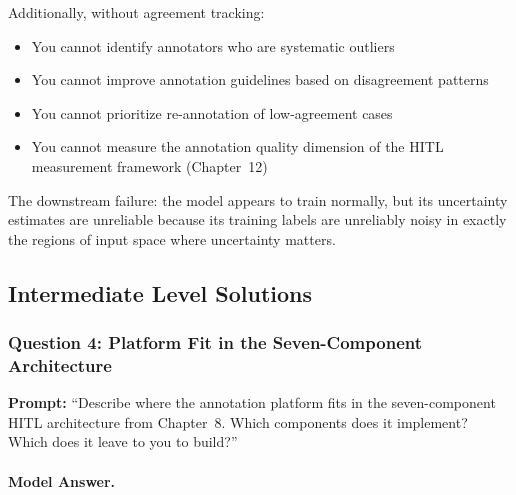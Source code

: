 Additionally, without agreement tracking:
\begin{itemize}
    \item You cannot identify annotators who are systematic outliers
    \item You cannot improve annotation guidelines based on disagreement patterns
    \item You cannot prioritize re-annotation of low-agreement cases
    \item You cannot measure the annotation quality dimension of the HITL measurement framework (Chapter~12)
\end{itemize}

The downstream failure: the model appears to train normally, but its uncertainty estimates are unreliable because its training labels are unreliably noisy in exactly the regions of input space where uncertainty matters.

\subsection{Intermediate Level Solutions}

\subsubsection{Question 4: Platform Fit in the Seven-Component Architecture}

\textbf{Prompt:} ``Describe where the annotation platform fits in the seven-component HITL architecture from Chapter~8. Which components does it implement? Which does it leave to you to build?''

\paragraph{Model Answer.}

